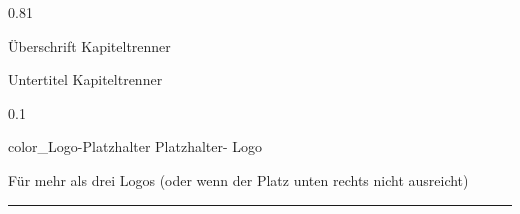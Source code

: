 \documentclass[xcolor=table,9pt,aspectratio=169]{beamer}
\begin{document}
\begin{frame}
 \begin{overlayarea}{\textwidth}{0.81\paperheight}
{

\vspace*{11mm}

 \textcolor{uolblue}
{Überschrift Kapiteltrenner}}

\vspace*{7mm}

{ \textcolor{uolblue}
{Untertitel Kapiteltrenner}}
 
\end{overlayarea}
\begin{overlayarea}{\textwidth}{0.1\paperheight}

    \begin{minipage}{0.5\textwidth}
    	\begin{beamercolorbox}[wd=10mm,ht=4mm,center]{color_Logo-Platzhalter}
   	 		\fontsize{3.5}{5} \selectfont  Platzhalter- \newline Logo  \vspace*{0.3mm}
    	\end{beamercolorbox} 
    \end{minipage}
    \begin{minipage}{0.6\textwidth}
    	\fontsize{4.5}{5.5} \selectfont \color{red} 
    	Für mehr als drei Logos (oder wenn der Platz unten rechts nicht ausreicht) 
    \end{minipage}
{\color{red} \hrule}



\end{overlayarea}
\end{frame}
\end{document}

